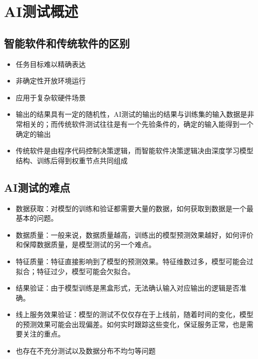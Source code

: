 \section{AI测试概述}

\subsection{智能软件和传统软件的区别}
\begin{itemize}
    \item 任务目标难以精确表达
    \item 非确定性开放环境运行
    \item 应用于复杂软硬件场景
    \item 输出的结果具有一定的随机性，AI测试的输出的结果与训练集的输入数据是非常相关的；而传统软件测试往往是有一个先验条件的，确定的输入能得到一个确定的输出
    \item 传统软件是由程序代码控制决策逻辑，而智能软件决策逻辑决由深度学习模型结构、训练后得到权重节点共同组成
\end{itemize}


\subsection{AI测试的难点}
\begin{itemize}
    \item 数据获取：对模型的训练和验证都需要大量的数据，如何获取到数据是一个最基本的问题。
    \item 数据质量：一般来说，数据质量越高，训练出的模型预测效果越好，如何评价和保障数据质量，是模型测试的另一个难点。
    \item 特征质量：特征直接影响到了模型的预测效果。特征维数过多，模型可能会过拟合；特征过少，模型可能会欠拟合。
    \item 结果验证：由于模型训练是黑盒形式，无法确认输入对应输出的逻辑是否准确。
    \item 线上服务效果验证：模型的测试不仅仅存在于上线前，随着时间的变化，模型的预测效果可能会出现偏差。如何实时跟踪这些变化，保证服务正常，也是需要关注的重点。
    \item 也存在不充分测试以及数据分布不均匀等问题
\end{itemize}

